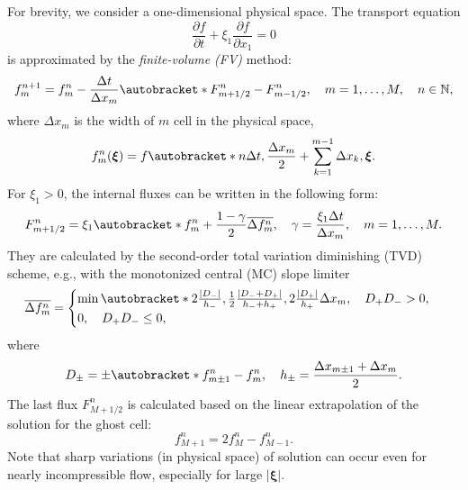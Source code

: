 \documentclass{article}
\newcommand{\pder}[2][]{\frac{\partial#1}{\partial#2}}
\DeclarePairedDelimiter\autobracket()       %
\newcommand{\br}[1]{\autobracket*{#1}}
\newcommand{\bxi}{{\boldsymbol{\xi}}}
\begin{document}
For brevity, we consider a one-dimensional physical space.
The transport equation
\begin{equation}\label{eq:transport}
    \pder[f]{t} + \xi_1\pder[f]{x_1} = 0
\end{equation}
is approximated by the \emph{finite-volume (FV)} method:
\begin{equation}\label{eq:finite_volume}
    f^{n+1}_m = f^n_m - \frac{\Delta{t}}{\Delta{x_m}}\br{F^n_{m+1/2}-F^n_{m-1/2}}, \quad
    m = 1,\dots,M, \quad n\in\mathbb{N},
\end{equation}
where \(\Delta{x_m}\) is the width of \(m\) cell in the physical space,
\begin{equation}\label{eq:vdf_fv}
    f^n_m(\bxi) = f\br{n\Delta{t}, \frac{\Delta{x_m}}2 + \sum_{k=1}^{m-1}\Delta{x_k}, \bxi}.
\end{equation}
For \(\xi_1>0\), the internal fluxes can be written in the following form:
\begin{equation}\label{eq:internal_fluxes}
    F_{m+1/2}^n = \xi_1\br{ f_m^n + \frac{1-\gamma}2\overline{\Delta{f_m^n}}},
    \quad \gamma = \frac{\xi_1\Delta{t}}{\Delta{x_m}}, \quad m = 1,\dots,M.
\end{equation}
They are calculated by the second-order total variation diminishing (TVD) scheme,
e.g., with the monotonized central (MC) slope limiter
\begin{equation}\label{eq:limiter}
    \overline{\Delta{f_m^n}} = \begin{cases}\min\br{
         2\frac{|D_-|}{h_-}, \frac12\frac{|D_-+D_+|}{h_-+h_+}, 2\frac{|D_+|}{h_+}
    }\Delta{x_m}, \quad D_+D_- > 0, \\
    0, \quad D_+D_- \leq 0,
    \end{cases}
\end{equation}
where
\begin{equation}\label{eq:differences}
    D_\pm = \pm\br{f_{m\pm1}^n - f_m^n}, \quad h_\pm = \frac{\Delta{x_{m\pm1}} + \Delta{x_m}}2.
\end{equation}
The last flux \(F_{M+1/2}^n\) is calculated based on the linear extrapolation of the solution for the ghost cell:
\begin{equation}\label{eq:last_ghost}
    f_{M+1}^n = 2f_M^n - f_{M-1}^n.
\end{equation}
Note that sharp variations (in physical space) of solution can occur even for nearly incompressible flow,
especially for large \(|\bxi|\).
\end{document}
